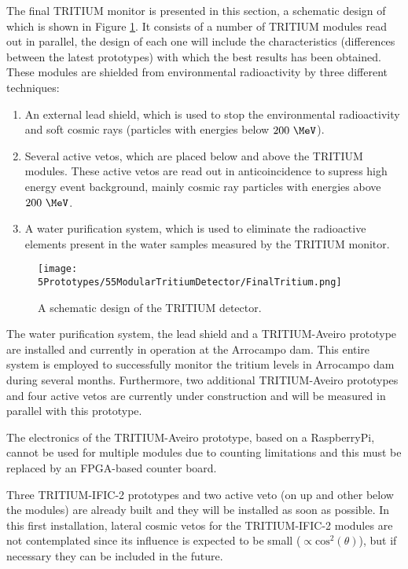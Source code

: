 The final TRITIUM monitor is presented in this section, a schematic design of which is shown in Figure \ref{fig:TritiumDetectorSchematicDesign}. It consists of a number of TRITIUM modules read out in parallel, the design of each one will include the characteristics (differences between the latest prototypes) with which the best results has been obtained. These modules are shielded from environmental radioactivity by three different techniques:

\begin{enumerate}

\item{} An external lead shield, which is used to stop the environmental radioactivity and soft cosmic rays (particles with energies below $200~\MeV$).

\item{} Several active vetos, which are placed below and above the TRITIUM modules. These active vetos are read out in anticoincidence to supress high energy event background, mainly cosmic ray particles with energies above $200~\MeV$.

\item{} A water purification system, which is used to eliminate the radioactive elements present in the water samples measured by the TRITIUM monitor.

\end{enumerate}

\begin{figure}[h]
\centering
\texttt{[image: 5Prototypes/55ModularTritiumDetector/FinalTritium.png]}
\caption{A schematic design of the TRITIUM detector.\label{fig:TritiumDetectorSchematicDesign}}
\end{figure}

The water purification system, the lead shield and a TRITIUM-Aveiro prototype are installed and currently in operation at the Arrocampo dam. This entire system is employed to successfully monitor the tritium levels in Arrocampo dam during several months. Furthermore, two additional TRITIUM-Aveiro prototypes and four active vetos are currently under construction and will be measured in parallel with this prototype.

The electronics of the TRITIUM-Aveiro prototype, based on a RaspberryPi, cannot be used for multiple modules due to counting limitations and this must be replaced by an FPGA-based counter board.

Three TRITIUM-IFIC-2 prototypes and two active veto (on up and other below the modules) are already built and they will be installed as soon as possible. In this first installation, lateral cosmic vetos for the TRITIUM-IFIC-2 modules are not contemplated since its influence is expected to be small ($\propto \text{cos}^2(\theta)$), but if necessary they can be included in the future.

